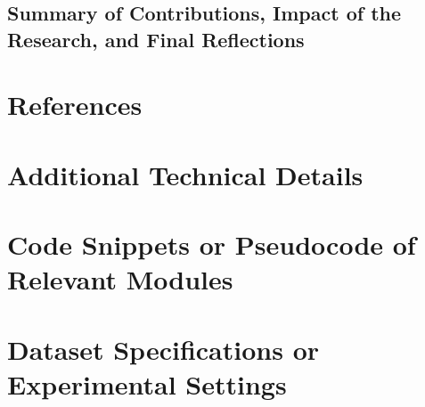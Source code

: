 \documentclass[12pt,a4paper]{report}
\begin{document}
\section{Summary of Contributions, Impact of the Research, and Final Reflections}


\chapter*{References}



\appendix

\chapter{Additional Technical Details}

\chapter{Code Snippets or Pseudocode of Relevant Modules}

\chapter{Dataset Specifications or Experimental Settings}
\end{document}

